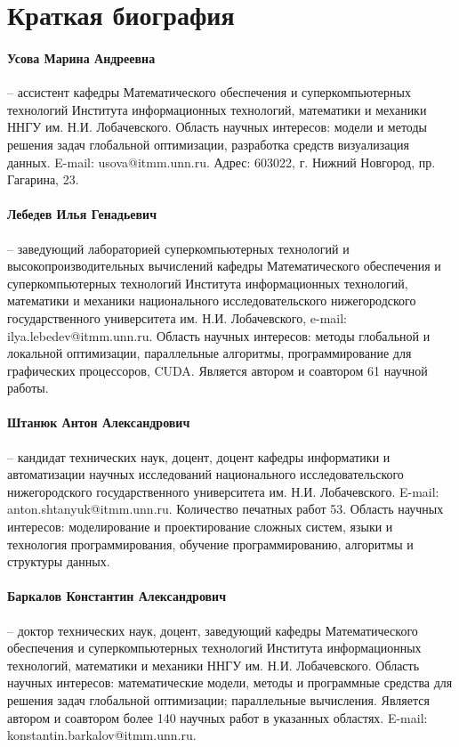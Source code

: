 \documentclass[a4paper,12pt,russian]{article}
\begin{document}

\section*{Краткая биография}
\paragraph{Усова Марина Андреевна} -- ассистент кафедры Математического обеспечения и суперкомпьютерных технологий Института информационных технологий, математики и механики ННГУ им. Н.И. Лобачевского. Область научных интересов: модели и методы решения задач глобальной оптимизации, разработка средств визуализация данных. E-mail: usova@itmm.unn.ru. Адрес: 603022, г. Нижний Новгород, пр. Гагарина, 23.
\paragraph{Лебедев Илья Генадьевич} -- заведующий лабораторией суперкомпьютерных технологий и высокопроизводительных вычислений кафедры Математического обеспечения и суперкомпьютерных технологий Института информационных технологий, математики и механики национального исследовательского нижегородского государственного университета им. Н.И. Лобачевского, e-mail: ilya.lebedev@itmm.unn.ru. Область научных интересов: методы глобальной и локальной оптимизации, параллельные алгоритмы, программирование для графических процессоров, CUDA. Является автором и соавтором 61 научной работы.
\paragraph{Штанюк Антон Александрович} -- кандидат технических наук, доцент, доцент кафедры информатики и автоматизации научных исследований национального исследовательского нижегородского государственного университета им. Н.И. Лобачевского. E-mail: anton.shtanyuk@itmm.unn.ru. Количество печатных работ 53. Область научных интересов: моделирование и проектирование сложных систем, языки и технология программирования, обучение программированию, алгоритмы и структуры данных.
\paragraph{Баркалов Константин Александрович} -- 
доктор технических наук, доцент, заведующий кафедры Математического обеспечения и суперкомпьютерных технологий Института информационных технологий, математики и механики ННГУ им. Н.И. Лобачевского. Область научных интересов: математические модели, методы и программные средства для решения задач глобальной оптимизации; параллельные вычисления. Является автором и соавтором более 140 научных работ в указанных областях. E-mail: konstantin.barkalov@itmm.unn.ru. 
\end{document}
